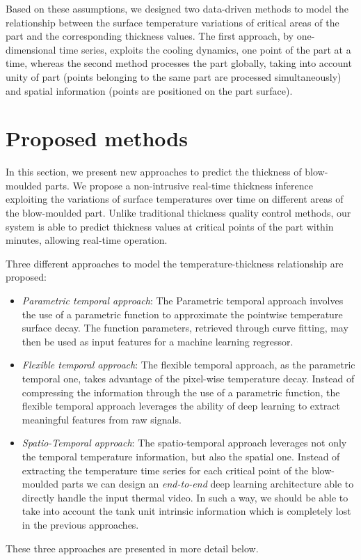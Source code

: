 Based on these assumptions, we designed two data-driven methods to model the relationship between the surface temperature variations of critical areas of the part and the corresponding thickness values. The first approach, by one-dimensional time series, exploits the cooling dynamics, one point of the part at a time, whereas the second method processes the part globally, taking into account unity of part (points belonging to the same part are processed simultaneously) and spatial information (points are positioned on the part surface).

\section{Proposed methods}

In this section, we present new approaches to predict the thickness of blow-moulded parts. We propose a non-intrusive real-time thickness inference exploiting the variations of surface temperatures over time on different areas of the blow-moulded part. 
Unlike traditional thickness quality control methods, our system is able to predict thickness values at critical points of the part within minutes, allowing real-time operation.

Three different approaches to model the temperature-thickness relationship are proposed:
%
\begin{itemize}
    \item \textit{Parametric temporal approach}: The Parametric temporal approach involves the use of a parametric function to approximate the pointwise temperature surface decay. The function parameters, retrieved through curve fitting, may then be used as input features for a machine learning regressor.
    \item \textit{Flexible temporal approach}: The flexible temporal approach, as the parametric temporal one, takes advantage of the pixel-wise temperature decay. Instead of compressing the information through the use of a parametric function, the flexible temporal approach leverages the ability of deep learning to extract meaningful features from raw signals.
    \item \textit{Spatio-Temporal approach}: The spatio-temporal approach leverages not only the temporal temperature information, but also the spatial one. Instead of extracting the temperature time series for each critical point of the blow-moulded parts we can design an \textit{end-to-end} deep learning architecture able to directly handle the input thermal video. In such a way, we should be able to take into account the tank unit intrinsic information which is completely lost in the previous approaches.
\end{itemize}
%
These three approaches are presented in more detail below.

